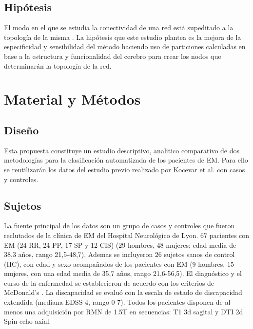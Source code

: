 \documentclass[fleqn,10pt]{UICArticle} %
\begin{document}
\subsection{Hipótesis}

El modo en el que se estudia la conectividad de una red está supeditado a la topología de la misma \cite{Fornito, Zalesky2010}. La hipótesis que este estudio plantea es la mejora de la especificidad y sensibilidad del método haciendo uso de particiones calculadas en base a la estructura y funcionalidad del cerebro para crear los nodos que determinarán la topología de la red. 


\section{Material y Métodos}

\subsection{Diseño}

Esta propuesta constituye un estudio descriptivo, analitico comparativo de dos metodologías para la clasificación automatizada de los pacientes de EM. Para ello se reutilizarán los datos del estudio previo realizado por Kocevar et al. \cite{Kocevar2016} con casos y controles.

\subsection{Sujetos}
La fuente principal de los datos son un grupo de casos y controles que fueron reclutados de la clínica de EM del Hospital Neurológico de Lyon. 67 pacientes con EM (24 RR, 24 PP, 17 SP y 12 CIS) (29 hombres, 48 mujeres; edad media de 38,3 años, rango 21,5-48,7). Ademas se incluyeron 26 sujetos sanos de control (HC), con edad y sexo acompañados de los pacientes con EM (9 hombres, 15 mujeres, con una edad media de 35,7 años, rango 21,6-56,5). El diagnóstico y el curso de la enfermedad se establecieron de acuerdo con los criterios de McDonald's \cite{Polman2011}. La discapacidad se evaluó con la escala de estado de discapacidad extendida (mediana EDSS 4, rango 0-7). Todos los pacientes disponen de al menos una adquisición por RMN de 1.5T en secuencias: T1 3d sagital y DTI 2d Spin echo axial.
\end{document}
